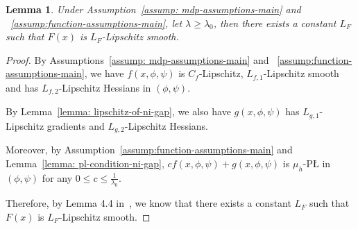 \documentclass{article}
\theoremstyle{plain}
\newtheorem{lemma}{Lemma}
\theoremstyle{definition}
\theoremstyle{remark}
\begin{document}
\begin{lemma}
    \label{lemma: lipschitz-constant-of-F}
    Under Assumption~\ref{assump: mdp-assumptions-main} and ~\ref{assump:function-assumptions-main}, let $\lambda \geq \lambda_0$, then
    there exists a constant $L_F$ such that $F(x)$ is $L_F$-Lipschitz smooth.
\end{lemma}
\begin{proof}
    By Assumptions~\ref{assump: mdp-assumptions-main} and ~\ref{assump:function-assumptions-main}, we have $f(x,\phi,\psi)$ is $C_f$-Lipschitz, $L_{f,1}$-Lipschitz smooth and has $L_{f,2}$-Lipschitz Hessians in $(\phi,\psi)$. 

    By Lemma~\ref{lemma: lipschitz-of-ni-gap}, we also have $g(x,\phi,\psi)$ has $L_{g,1}$-Lipschitz gradients and $L_{g,2}$-Lipschitz Hessians.

    Moreover, by Assumption~\ref{assump:function-assumptions-main} and Lemma~\ref{lemma: pl-condition-ni-gap}, $c f(x,\phi,\psi) + g(x,\phi,\psi)$ is $\mu_h$-P{\L} in $(\phi,\psi)$ for any $0 \leq c \leq \frac{1}{\lambda_0}$.

    Therefore, by Lemma 4.4 in~\citet{chen2024finding}, we know that there exists a constant $L_F$ such that $F(x)$ is $L_F$-Lipschitz smooth.

\end{proof}
\end{document}
